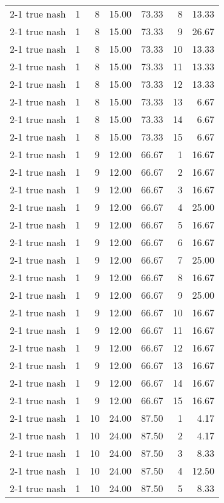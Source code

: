 \begin{tabular}{lrrrrrr}
2-1  true nash & 1 & 8 & 15.00 & 73.33 & 8 & 13.33 \\
2-1  true nash & 1 & 8 & 15.00 & 73.33 & 9 & 26.67 \\
2-1  true nash & 1 & 8 & 15.00 & 73.33 & 10 & 13.33 \\
2-1  true nash & 1 & 8 & 15.00 & 73.33 & 11 & 13.33 \\
2-1  true nash & 1 & 8 & 15.00 & 73.33 & 12 & 13.33 \\
2-1  true nash & 1 & 8 & 15.00 & 73.33 & 13 & 6.67 \\
2-1  true nash & 1 & 8 & 15.00 & 73.33 & 14 & 6.67 \\
2-1  true nash & 1 & 8 & 15.00 & 73.33 & 15 & 6.67 \\
2-1  true nash & 1 & 9 & 12.00 & 66.67 & 1 & 16.67 \\
2-1  true nash & 1 & 9 & 12.00 & 66.67 & 2 & 16.67 \\
2-1  true nash & 1 & 9 & 12.00 & 66.67 & 3 & 16.67 \\
2-1  true nash & 1 & 9 & 12.00 & 66.67 & 4 & 25.00 \\
2-1  true nash & 1 & 9 & 12.00 & 66.67 & 5 & 16.67 \\
2-1  true nash & 1 & 9 & 12.00 & 66.67 & 6 & 16.67 \\
2-1  true nash & 1 & 9 & 12.00 & 66.67 & 7 & 25.00 \\
2-1  true nash & 1 & 9 & 12.00 & 66.67 & 8 & 16.67 \\
2-1  true nash & 1 & 9 & 12.00 & 66.67 & 9 & 25.00 \\
2-1  true nash & 1 & 9 & 12.00 & 66.67 & 10 & 16.67 \\
2-1  true nash & 1 & 9 & 12.00 & 66.67 & 11 & 16.67 \\
2-1  true nash & 1 & 9 & 12.00 & 66.67 & 12 & 16.67 \\
2-1  true nash & 1 & 9 & 12.00 & 66.67 & 13 & 16.67 \\
2-1  true nash & 1 & 9 & 12.00 & 66.67 & 14 & 16.67 \\
2-1  true nash & 1 & 9 & 12.00 & 66.67 & 15 & 16.67 \\
2-1  true nash & 1 & 10 & 24.00 & 87.50 & 1 & 4.17 \\
2-1  true nash & 1 & 10 & 24.00 & 87.50 & 2 & 4.17 \\
2-1  true nash & 1 & 10 & 24.00 & 87.50 & 3 & 8.33 \\
2-1  true nash & 1 & 10 & 24.00 & 87.50 & 4 & 12.50 \\
2-1  true nash & 1 & 10 & 24.00 & 87.50 & 5 & 8.33 \\

\end{tabular}
